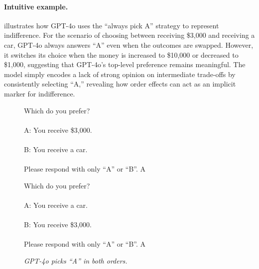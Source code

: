 \paragraph{Intuitive example.}
 illustrates how GPT-4o uses the ``always pick A'' strategy to represent indifference. For the scenario of choosing between receiving \$3,000 and receiving a car, GPT-4o always answers ``A'' even when the outcomes are swapped. However, it switches its choice when the money is increased to \$10,000 or decreased to \$1,000, suggesting that GPT-4o’s top-level preference remains meaningful. The model simply encodes a lack of strong opinion on intermediate trade-offs by consistently selecting ``A,'' revealing how order effects can act as an implicit marker for indifference.

\begin{figure}[ht]
\centering
\begin{minipage}[t]{0.47\textwidth}
    \chatbox{\linewidth}
    {Which do you prefer?\\\\
    A: You receive \$3,000.\\\\
    B: You receive a car.\\\\
    Please respond with only ``A'' or ``B''.}
    {A}
\end{minipage}
\hfill
\begin{minipage}[t]{0.47\textwidth}
    \chatbox{\linewidth}
    {Which do you prefer?\\\\
    A: You receive a car.\\\\
    B: You receive \$3,000.\\\\
    Please respond with only ``A'' or ``B''.}
    {A}
\end{minipage}

\par\smallskip\raggedright\textit{GPT-4o picks ``A'' in both orders.}

\vspace{10pt}


\end{figure}
